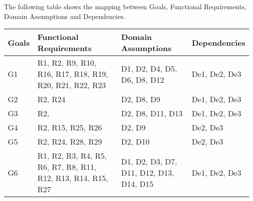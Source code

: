 \documentclass[a4paper, 11pt, titlepage]{article}
\begin{document}
\hfill

The following table shows the mapping between Goals, Functional Requirements, Domain Assumptions and Dependencies.
\begin{center}
    \begin{tabularx}{\linewidth} {| l | X | X | X |}
    \hline
    \textbf{Goals} & \textbf{Functional Requirements} & \textbf{Domain Assumptions} & \textbf{Dependencies}\\
    \hline
    G1 & R1, R2, R9, R10, R16, R17, R18, R19, R20, R21, R22, R23 & 
    D1, D2, D4, D5, D6, D8, D12  & De1, De2, De3\\
    \hline
    G2 & R2, R24 & D2, D8, D9 & De1, De2, De3\\
    \hline
    G3 & R2, & D2, D8, D11, D13 & De1, De2, De3\\
    \hline
    G4 & R2, R15, R25, R26& D2, D9 & De2, De3\\
    \hline
    G5 & R2, R24, R28, R29& D2, D10 & De2, De3\\
    \hline
    G6 & R1, R2, R3, R4, R5, R6, R7, R8, R11, R12, R13, R14, R15, R27 & 
    D1, D2, D3, D7, D11, D12, D13, D14, D15 & De1, De2, De3\\
    \hline
    \end{tabularx}
\end{center}

\hfill 
\end{document}
